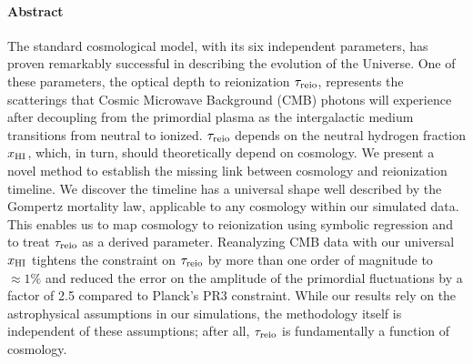 

\paragraph{\large Abstract}

The standard cosmological model, with its six independent parameters,
has proven remarkably successful in describing the evolution of the
Universe.
One of these parameters, the optical depth to reionization $\tau_{\mathrm{reio}}$,
represents the scatterings that Cosmic Microwave Background (CMB)
photons will experience after decoupling from the primordial plasma as
the intergalactic medium transitions from neutral to ionized.
$\tau_{\mathrm{reio}}$ depends on the neutral hydrogen fraction $x_{\mathrm{HI}}$, which, in
turn, should theoretically depend on cosmology.
We present a novel method to establish the missing link between
cosmology and reionization timeline.
We discover the timeline has a universal shape well described by the
Gompertz mortality law, applicable to any cosmology within our simulated
data.
This enables us to map cosmology to reionization using
symbolic regression and to treat $\tau_{\mathrm{reio}}$ as a derived parameter.
Reanalyzing CMB data with our universal $x_{\mathrm{HI}}$ tightens the constraint
on $\tau_{\mathrm{reio}}$ by more than one order of magnitude to $\approx 1\%$ and
reduced the error on the amplitude of the primordial fluctuations by a
factor of 2.5 compared to Planck's PR3 constraint.
While our results rely on the astrophysical assumptions in our
simulations, the methodology itself is independent of these assumptions;
after all, $\tau_{\mathrm{reio}}$ is fundamentally a function of cosmology.
